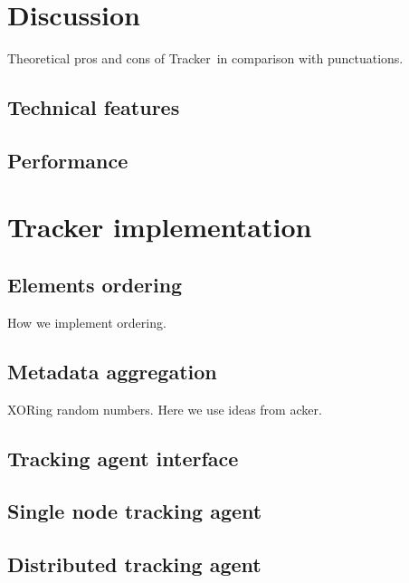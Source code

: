\documentclass{vldb}
\newcommand {\tracker} {Tracker}
\begin{document}
\section{Discussion}

Theoretical pros and cons of \tracker\ in comparison with punctuations.

\subsection{Technical features}

\subsection{Performance}

\section{Tracker implementation}

\subsection{Elements ordering}

How we implement ordering.

\subsection{Metadata aggregation}

XORing random numbers. Here we use ideas from acker.

\subsection{Tracking agent interface}

\subsection{Single node tracking agent}

\subsection{Distributed tracking agent}


\end{document}
